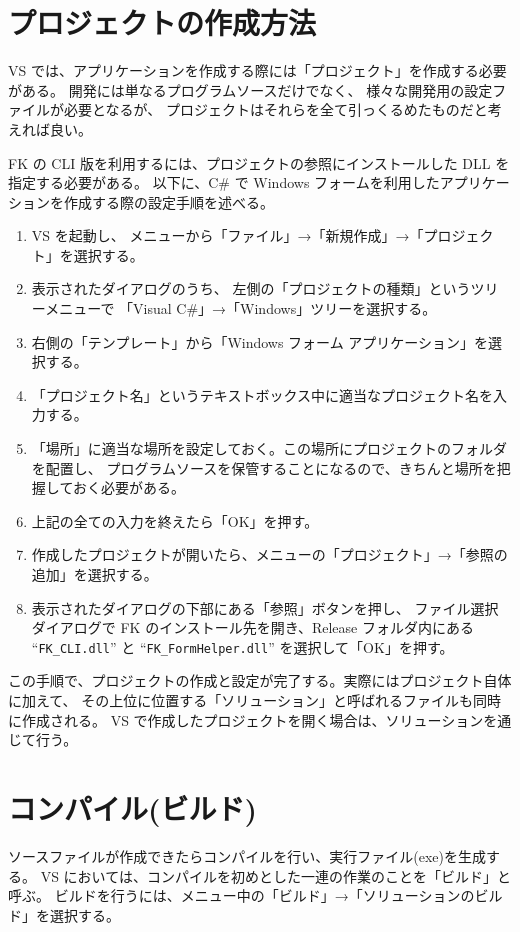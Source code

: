 \documentclass[a4j]{jarticle}
\begin{document}
\section{プロジェクトの作成方法}
VS では、アプリケーションを作成する際には「プロジェクト」を作成する必要がある。
開発には単なるプログラムソースだけでなく、
様々な開発用の設定ファイルが必要となるが、
プロジェクトはそれらを全て引っくるめたものだと考えれば良い。

FK の CLI 版を利用するには、プロジェクトの参照にインストールした DLL を指定する必要がある。
以下に、C# で Windows フォームを利用したアプリケーションを作成する際の設定手順を述べる。

\begin{enumerate}
 \item VS を起動し、
	メニューから「ファイル」→「新規作成」→「プロジェクト」を選択する。
 \item 表示されたダイアログのうち、
	左側の「プロジェクトの種類」というツリーメニューで
	「Visual C#」→「Windows」ツリーを選択する。
 \item 右側の「テンプレート」から「Windows フォーム アプリケーション」を選択する。
 \item 「プロジェクト名」というテキストボックス中に適当なプロジェクト名を入力する。
 \item 「場所」に適当な場所を設定しておく。この場所にプロジェクトのフォルダを配置し、
	プログラムソースを保管することになるので、きちんと場所を把握しておく必要がある。
 \item 上記の全ての入力を終えたら「OK」を押す。
 \item 作成したプロジェクトが開いたら、メニューの「プロジェクト」→「参照の追加」を選択する。
 \item 表示されたダイアログの下部にある「参照」ボタンを押し、
 	ファイル選択ダイアログで FK のインストール先を開き、Release フォルダ内にある
 	``\verb+FK_CLI.dll+'' と ``\verb+FK_FormHelper.dll+'' を選択して「OK」を押す。
\end{enumerate}

この手順で、プロジェクトの作成と設定が完了する。実際にはプロジェクト自体に加えて、
その上位に位置する「ソリューション」と呼ばれるファイルも同時に作成される。
VS で作成したプロジェクトを開く場合は、ソリューションを通じて行う。


\section{コンパイル(ビルド)}
ソースファイルが作成できたらコンパイルを行い、実行ファイル(exe)を生成する。
VS においては、コンパイルを初めとした一連の作業のことを「ビルド」と呼ぶ。
ビルドを行うには、メニュー中の「ビルド」→「ソリューションのビルド」を選択する。
\end{document}
